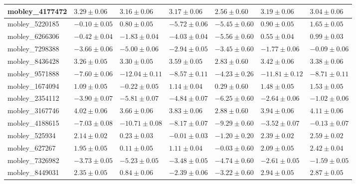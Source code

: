 \documentclass{article}
\begin{document}
\begin{landscape}
\begin{longtable}{|l{3.0cm}|l{3.0cm}|l{3.2cm}|l{3.6cm}|l{3.0cm}|l{3.0cm}|l{3.0cm}|}
mobley\_4177472	&	$	3.29	\pm	0.06	$	&	$	3.16	\pm	0.06	$	&	$	3.17	\pm	0.06	$	&	$	2.56	\pm	0.60	$	&	$	3.19	\pm	0.06	$	&	$	3.04	\pm	0.06	$	\\ \hline
mobley\_5220185	&	$	-0.10	\pm	0.05	$	&	$	0.80	\pm	0.05	$	&	$	-5.72	\pm	0.06	$	&	$	-5.45	\pm	0.60	$	&	$	0.90	\pm	0.05	$	&	$	1.65	\pm	0.05	$	\\ \hline
mobley\_6266306	&	$	-0.42	\pm	0.04	$	&	$	-1.83	\pm	0.04	$	&	$	-4.03	\pm	0.04	$	&	$	-5.56	\pm	0.60	$	&	$	0.55	\pm	0.04	$	&	$	0.99	\pm	0.03	$	\\ \hline
mobley\_7298388	&	$	-3.66	\pm	0.06	$	&	$	-5.00	\pm	0.06	$	&	$	-2.94	\pm	0.05	$	&	$	-3.45	\pm	0.60	$	&	$	-1.77	\pm	0.06	$	&	$	-0.09	\pm	0.06	$	\\ \hline
mobley\_8436428	&	$	3.26	\pm	0.05	$	&	$	3.30	\pm	0.05	$	&	$	3.59	\pm	0.05	$	&	$	2.83	\pm	0.60	$	&	$	3.42	\pm	0.06	$	&	$	3.38	\pm	0.06	$	\\ \hline
mobley\_9571888	&	$	-7.60	\pm	0.06	$	&	$	-12.04	\pm	0.11	$	&	$	-8.57	\pm	0.11	$	&	$	-4.23	\pm	0.26	$	&	$	-11.81	\pm	0.12	$	&	$	-8.71	\pm	0.11	$	\\ \hline
mobley\_1674094	&	$	1.09	\pm	0.05	$	&	$	-0.22	\pm	0.05	$	&	$	1.14	\pm	0.04	$	&	$	0.29	\pm	0.60	$	&	$	1.48	\pm	0.05	$	&	$	1.53	\pm	0.05	$	\\ \hline
mobley\_2354112	&	$	-3.90	\pm	0.07	$	&	$	-5.81	\pm	0.07	$	&	$	-4.84	\pm	0.07	$	&	$	-6.25	\pm	0.60	$	&	$	-2.64	\pm	0.06	$	&	$	-1.02	\pm	0.06	$	\\ \hline
mobley\_3167746	&	$	4.02	\pm	0.06	$	&	$	3.66	\pm	0.06	$	&	$	3.83	\pm	0.06	$	&	$	2.88	\pm	0.60	$	&	$	3.94	\pm	0.06	$	&	$	4.11	\pm	0.06	$	\\ \hline
mobley\_4188615	&	$	-7.03	\pm	0.08	$	&	$	-10.71	\pm	0.08	$	&	$	-8.17	\pm	0.07	$	&	$	-9.29	\pm	0.60	$	&	$	-3.52	\pm	0.07	$	&	$	-0.13	\pm	0.07	$	\\ \hline
mobley\_525934	&	$	2.14	\pm	0.02	$	&	$	0.23	\pm	0.03	$	&	$	-0.01	\pm	0.03	$	&	$	-1.20	\pm	0.20	$	&	$	2.39	\pm	0.02	$	&	$	2.59	\pm	0.02	$	\\ \hline
mobley\_627267	&	$	1.95	\pm	0.05	$	&	$	0.11	\pm	0.05	$	&	$	1.11	\pm	0.04	$	&	$	-0.03	\pm	0.60	$	&	$	2.09	\pm	0.05	$	&	$	2.42	\pm	0.04	$	\\ \hline
mobley\_7326982	&	$	-3.73	\pm	0.05	$	&	$	-5.23	\pm	0.05	$	&	$	-3.48	\pm	0.05	$	&	$	-4.74	\pm	0.60	$	&	$	-2.61	\pm	0.05	$	&	$	-1.59	\pm	0.05	$	\\ \hline
mobley\_8449031	&	$	2.35	\pm	0.05	$	&	$	0.84	\pm	0.06	$	&	$	-2.39	\pm	0.06	$	&	$	-3.22	\pm	0.60	$	&	$	2.94	\pm	0.05	$	&	$	2.87	\pm	0.05	$	\\ \hline

\end{longtable}
\end{landscape}
\end{document}
